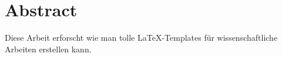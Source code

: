 \section*{Abstract}

Diese Arbeit erforscht wie man tolle LaTeX-Templates für wissenschaftliche Arbeiten erstellen kann.
